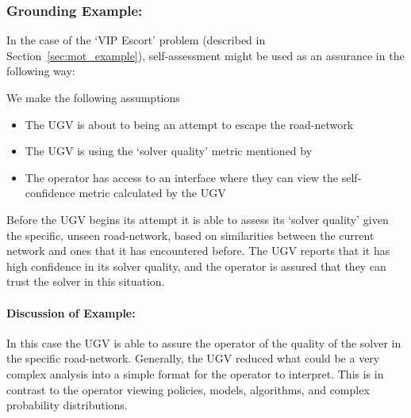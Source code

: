 


\subsubsection{Grounding Example:}
In the case of the `VIP Escort' problem (described in Section~\ref{sec:mot_example}), self-assessment might be used as an assurance in the following way:

We make the following assumptions

\begin{itemize}
    \item The UGV is about to being an attempt to escape the road-network
    \item The UGV is using the `solver quality' metric mentioned by \citet{Aitken2016-fb}
    \item The operator has access to an interface where they can view the self-confidence metric calculated by the UGV
\end{itemize}

Before the UGV begins its attempt it is able to assess its `solver quality' given the specific, unseen road-network, based on similarities between the current network and ones that it has encountered before. The UGV reports that it has high confidence in its solver quality, and the operator is assured that they can trust the solver in this situation.

\paragraph{\textbf{Discussion of Example:}} In this case the UGV is able to assure the operator of the quality of the solver in the specific road-network. Generally, the UGV reduced what could be a very complex analysis into a simple format for the operator to interpret. This is in contrast to the operator viewing policies, models, algorithms, and complex probability distributions.
